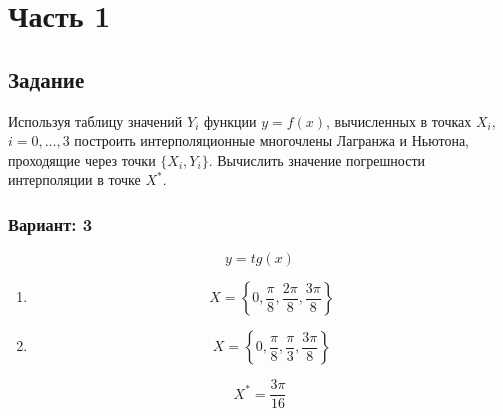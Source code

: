 
\chapter*{Часть 1}

\section*{Задание}
Используя таблицу значений $Y_i$ функции $y=f(x)$,
вычисленных в
точках $X_i$, $i=0,\dots,3$ построить интерполяционные
многочлены Лагранжа
и Ньютона, проходящие через точки $\{X_i, Y_i\}$.
Вычислить значение
погрешности интерполяции в точке $X^*$.

\subsection*{Вариант: 3}


$$y = tg(x)$$

\begin{enumerate} 
    \item \begin{equation*}X=\left\{0, 
        \frac{\pi}{8}, \frac{2\pi}{8},
        \frac{3\pi}{8}\right\}
    \end{equation*}

    \item \begin{equation*}X=\left\{0,
        \frac{\pi}{8}, \frac{\pi}{3},
        \frac{3\pi}{8}\right\}
    \end{equation*}
\end{enumerate}

\begin{equation*}X^* = \frac{3\pi}{16}\end{equation*}
\pagebreak